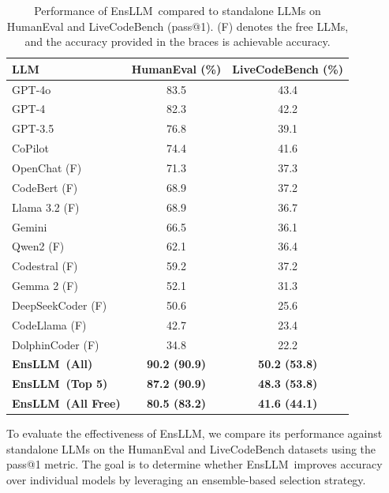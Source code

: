 \documentclass{article}
\newcommand{\tool}{EnsLLM}
\begin{document}
\begin{table}[t!]
    \centering
    \caption{Performance of \tool\ compared to standalone LLMs on HumanEval and LiveCodeBench (pass@1). (F) denotes the free LLMs, and the accuracy provided in the braces is achievable accuracy.}
    \label{tab:elfcg_performance}
    \begin{tabular}{|l|c|c|}
        \hline
        \textbf{LLM} & \textbf{HumanEval (\%)} & \textbf{LiveCodeBench (\%)} \\
        \hline
        GPT-4o         & 83.5  & 43.4  \\
        GPT-4          & 82.3  & 42.2  \\
        GPT-3.5        & 76.8  & 39.1  \\
        CoPilot        & 74.4  & 41.6  \\
        OpenChat (F)      & 71.3  & 37.3  \\
        CodeBert (F)      & 68.9  & 37.2  \\
        Llama 3.2 (F)     & 68.9  & 36.7  \\
        Gemini         & 66.5  & 36.1  \\
        Qwen2 (F)         & 62.1  & 36.4  \\
        Codestral (F)     & 59.2  & 37.2  \\
        Gemma 2  (F)      & 52.1  & 31.3  \\
        DeepSeekCoder (F)  & 50.6  & 25.6  \\
        CodeLlama  (F)     & 42.7  & 23.4  \\
        DolphinCoder (F)   & 34.8  & 22.2  \\
        \hline
        \textbf{\tool\ (All)} & \textbf{90.2 (90.9)} & \textbf{50.2 (53.8)} \\
        \hline
        \textbf{\tool\ (Top 5)} & \textbf{87.2 (90.9)} & \textbf{48.3 (53.8)} \\
        \hline
        \textbf{\tool\ (All Free)} & \textbf{80.5 (83.2)} & \textbf{41.6 (44.1)} \\
        \hline
    \end{tabular}
\end{table}

\leavevmode\par
To evaluate the effectiveness of \tool, we compare its performance against standalone LLMs on the HumanEval and LiveCodeBench datasets using the pass@1 metric. The goal is to determine whether \tool\ improves accuracy over individual models by leveraging an ensemble-based selection strategy.
\end{document}
